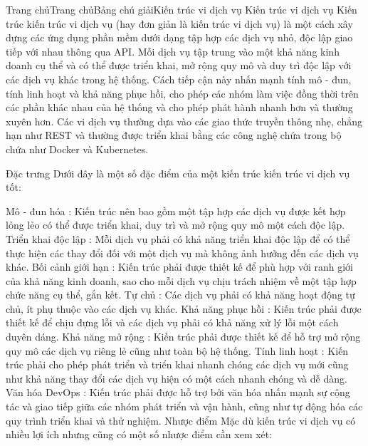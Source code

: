 Trang chủTrang chủBảng chú giảiKiến trúc vi dịch vụ
Kiến trúc vi dịch vụ
Kiến trúc kiến trúc vi dịch vụ (hay đơn giản là kiến trúc vi dịch vụ) là một cách xây dựng các ứng dụng phần mềm dưới dạng tập hợp các dịch vụ nhỏ, độc lập giao tiếp với nhau thông qua API. Mỗi dịch vụ tập trung vào một khả năng kinh doanh cụ thể và có thể được triển khai, mở rộng quy mô và duy trì độc lập với các dịch vụ khác trong hệ thống. Cách tiếp cận này nhấn mạnh tính mô - đun, tính linh hoạt và khả năng phục hồi, cho phép các nhóm làm việc đồng thời trên các phần khác nhau của hệ thống và cho phép phát hành nhanh hơn và thường xuyên hơn. Các vi dịch vụ thường dựa vào các giao thức truyền thông nhẹ, chẳng hạn như REST và thường được triển khai bằng các công nghệ chứa trong bộ chứa như Docker và Kubernetes.

Đặc trưng
Dưới đây là một số đặc điểm của một kiến trúc kiến trúc vi dịch vụ tốt:

Mô - đun hóa : Kiến trúc nên bao gồm một tập hợp các dịch vụ được kết hợp lỏng lẻo có thể được triển khai, duy trì và mở rộng quy mô một cách độc lập.
Triển khai độc lập : Mỗi dịch vụ phải có khả năng triển khai độc lập để có thể thực hiện các thay đổi đối với một dịch vụ mà không ảnh hưởng đến các dịch vụ khác.
Bối cảnh giới hạn : Kiến trúc phải được thiết kế để phù hợp với ranh giới của khả năng kinh doanh, sao cho mỗi dịch vụ chịu trách nhiệm về một tập hợp chức năng cụ thể, gắn kết.
Tự chủ : Các dịch vụ phải có khả năng hoạt động tự chủ, ít phụ thuộc vào các dịch vụ khác.
Khả năng phục hồi : Kiến trúc phải được thiết kế để chịu đựng lỗi và các dịch vụ phải có khả năng xử lý lỗi một cách duyên dáng.
Khả năng mở rộng : Kiến trúc phải được thiết kế để hỗ trợ mở rộng quy mô các dịch vụ riêng lẻ cũng như toàn bộ hệ thống.
Tính linh hoạt : Kiến trúc phải cho phép phát triển và triển khai nhanh chóng các dịch vụ mới cũng như khả năng thay đổi các dịch vụ hiện có một cách nhanh chóng và dễ dàng.
Văn hóa DevOps : Kiến trúc phải được hỗ trợ bởi văn hóa nhấn mạnh sự cộng tác và giao tiếp giữa các nhóm phát triển và vận hành, cũng như tự động hóa các quy trình triển khai và thử nghiệm.
Nhược điểm
Mặc dù kiến trúc vi dịch vụ có nhiều lợi ích nhưng cũng có một số nhược điểm cần xem xét:

